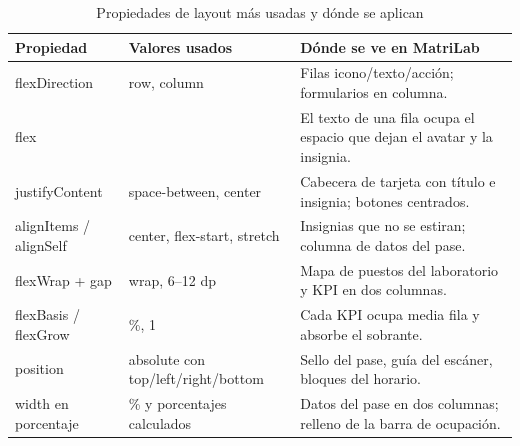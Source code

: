 \begin{table}[H]
\centering\small
\caption{Propiedades de layout más usadas y dónde se aplican}\label{tab:props}
\renewcommand{\arraystretch}{1.25}
\begin{tabular}{|>{\raggedright\arraybackslash}p{}|>{\raggedright\arraybackslash}p{}|>{\raggedright\arraybackslash}p{}|}
\hline
\rowcolor{colabpyblue} \color{white}\textbf{Propiedad} & \color{white}\textbf{Valores usados} & \color{white}\textbf{Dónde se ve en MatriLab} \\ \hline
flexDirection & row, column & Filas icono/texto/acción; formularios en columna. \\ \hline
\rowcolor{colabpybg} flex & 1 & El texto de una fila ocupa el espacio que dejan el avatar y la insignia. \\ \hline
justifyContent & space-between, center & Cabecera de tarjeta con título e insignia; botones centrados. \\ \hline
\rowcolor{colabpybg} alignItems / alignSelf & center, flex-start, stretch & Insignias que no se estiran; columna de datos del pase. \\ \hline
flexWrap + gap & wrap, 6–12 dp & Mapa de puestos del laboratorio y KPI en dos columnas. \\ \hline
\rowcolor{colabpybg} flexBasis / flexGrow & 47 \%, 1 & Cada KPI ocupa media fila y absorbe el sobrante. \\ \hline
position & absolute con top/left/right/bottom & Sello del pase, guía del escáner, bloques del horario. \\ \hline
\rowcolor{colabpybg} width en porcentaje & 50 \% y porcentajes calculados & Datos del pase en dos columnas; relleno de la barra de ocupación. \\ \hline
\end{tabular}
\end{table}

\vspace{0.2cm}

